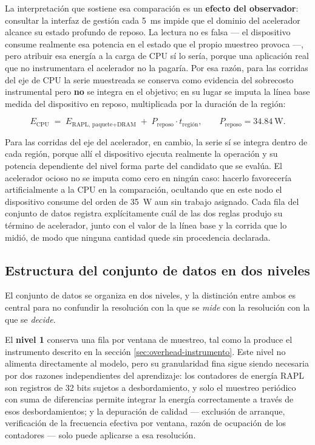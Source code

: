 \documentclass[12pt,oneside,spanish]{book}
\begin{document}
La interpretación que sostiene esa comparación es un \textbf{efecto del observador}: consultar la interfaz de gestión cada 5~ms impide que el dominio del acelerador alcance su estado profundo de reposo. La lectura no es falsa --- el dispositivo consume realmente esa potencia en el estado que el propio muestreo provoca ---, pero atribuir esa energía a la carga de CPU sí lo sería, porque una aplicación real que no instrumentara el acelerador no la pagaría. Por esa razón, para las corridas del eje de CPU la serie muestreada se conserva como evidencia del sobrecosto instrumental pero \textbf{no} se integra en el objetivo; en su lugar se imputa la línea base medida del dispositivo en reposo, multiplicada por la duración de la región:

\begin{equation}
\label{eq:energia-cpu}
E_{\text{CPU}} \;=\; E_{\text{RAPL, paquete+DRAM}} \;+\; P_{\text{reposo}} \cdot t_{\text{región}},
\qquad P_{\text{reposo}} = 34.84~\text{W}.
\end{equation}

Para las corridas del eje del acelerador, en cambio, la serie sí se integra dentro de cada región, porque allí el dispositivo ejecuta realmente la operación y su potencia dependiente del nivel forma parte del candidato que se evalúa. El acelerador ocioso no se imputa como cero en ningún caso: hacerlo favorecería artificialmente a la CPU en la comparación, ocultando que en este nodo el dispositivo consume del orden de 35~W aun sin trabajo asignado. Cada fila del conjunto de datos registra explícitamente cuál de las dos reglas produjo su término de acelerador, junto con el valor de la línea base y la corrida que lo midió, de modo que ninguna cantidad quede sin procedencia declarada.

\subsection{Estructura del conjunto de datos en dos niveles}
\label{sec:fase2-dataset}

El conjunto de datos se organiza en dos niveles, y la distinción entre ambos es central para no confundir la resolución con la que se \textit{mide} con la resolución con la que se \textit{decide}.

El \textbf{nivel 1} conserva una fila por ventana de muestreo, tal como la produce el instrumento descrito en la sección \ref{sec:overhead-instrumento}. Este nivel no alimenta directamente al modelo, pero su granularidad fina sigue siendo necesaria por dos razones independientes del aprendizaje: los contadores de energía RAPL son registros de 32 bits sujetos a desbordamiento, y solo el muestreo periódico con suma de diferencias permite integrar la energía correctamente a través de esos desbordamientos; y la depuración de calidad --- exclusión de arranque, verificación de la frecuencia efectiva por ventana, razón de ocupación de los contadores --- solo puede aplicarse a esa resolución.
\end{document}
